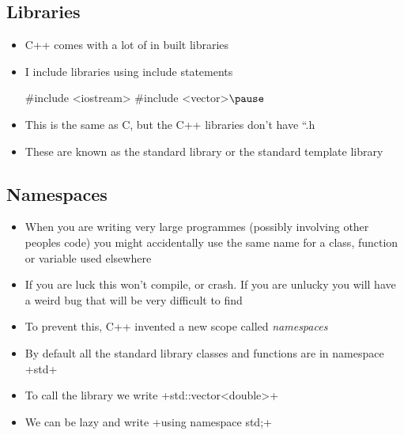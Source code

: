 \begin{slide}
\section{Libraries}

\begin{PauseHighLight}
  \begin{itemize}
  \item C++ comes with a lot of in built libraries\pause
  \item I include libraries using include statements
    \begin{cpp}
      #include <iostream>
      #include <vector>$\pause$
    \end{cpp}
    \vspace*{-1cm}
  \item This is the same as C, but the C++ libraries don't have
    ``.h\pause
  \item These are known as the standard library or the standard
    template library\pause
  \end{itemize}
\end{PauseHighLight}

\end{slide}



\begin{slide}
\section[-2]{Namespaces}

\begin{PauseHighLight}
  \begin{itemize}
  \item When you are writing very large programmes (possibly involving
    other peoples code) you might accidentally use the same name for a
    class, function or variable used elsewhere\pause
  \item If you are luck this won't compile, or crash\pause. If you are
    unlucky you will have a weird bug that will be very difficult to
    find\pause
  \item To prevent this, C++ invented a new scope called
    \emph{namespaces}\pause
  \item By default all the standard library classes and functions are
    in namespace \jl+std+\pause
  \item To call the library we write \jl+std::vector<double>+\pause
  \item We can be lazy and write \jl+using namespace std;+\pause
  \end{itemize}
\end{PauseHighLight}

\end{slide}

